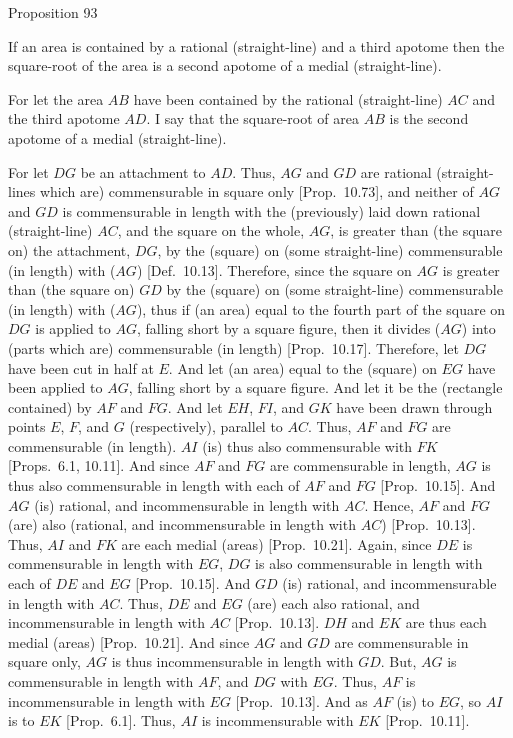 
\begin{center}
{\large Proposition 93}
\end{center}

If an area is contained by a rational (straight-line)
and a third apotome then the square-root of the area is a second apotome
of a medial (straight-line).

\epsfysize=1.3in
\centerline{}

For let the area $AB$ have been contained by the rational (straight-line)
$AC$ and the third apotome $AD$. I say that the square-root of area $AB$
is the second apotome of a medial (straight-line).

For let $DG$ be an attachment to $AD$. Thus, $AG$ and $GD$ are rational (straight-lines which are) commensurable in square only [Prop.~10.73], and neither of $AG$ and $GD$
is commensurable in length with the (previously) laid down rational (straight-line) $AC$, and the square on the whole, $AG$, is greater than
(the square on) the attachment, $DG$, by the (square) on (some straight-line)
commensurable (in length) with ($AG$) [Def.~10.13]. 
Therefore, since the square on $AG$ is greater than (the square on)
$GD$ by the (square) on (some straight-line) commensurable (in length)
with ($AG$), thus if (an area) equal to the fourth part of the square on $DG$
is applied to $AG$, falling short by a square figure, then it divides ($AG$)
into (parts which are) commensurable (in length) [Prop.~10.17]. Therefore, let $DG$ have been
cut in half at $E$. And let (an area) equal to the (square) on $EG$
have been applied to $AG$, falling short by a square figure.
And let it be the (rectangle contained) by $AF$ and $FG$. And let
$EH$, $FI$, and $GK$ have been drawn through points $E$, $F$, and $G$
(respectively), parallel to $AC$. Thus, $AF$ and $FG$ are
commensurable (in length). $AI$ (is) thus also commensurable with
$FK$ [Props.~6.1, 10.11]. 
 And since $AF$ and $FG$ are commensurable
in length, $AG$ is thus also commensurable in length with each of
$AF$ and $FG$ [Prop.~10.15]. And
$AG$ (is) rational, and incommensurable in length with $AC$. 
Hence, $AF$ and $FG$ (are) also (rational, and incommensurable in length
with $AC$) [Prop.~10.13]. 
Thus, $AI$ and $FK$ are each medial (areas) [Prop.~10.21]. Again, since $DE$ is commensurable
in length with $EG$, $DG$ is also commensurable
in length with each of $DE$ and $EG$ [Prop.~10.15]. And $GD$ (is) rational, and incommensurable in length with $AC$. Thus, $DE$ and $EG$ (are)
each also rational, and incommensurable in length with $AC$ [Prop.~10.13]. $DH$ and $EK$ are thus
each medial (areas) [Prop.~10.21]. And since 
$AG$ and $GD$ are commensurable in square only, $AG$ is thus
incommensurable in length with $GD$. But, $AG$ is commensurable in
length with $AF$, and $DG$ with $EG$. Thus, $AF$ is incommensurable
in length with $EG$ [Prop.~10.13]. 
And as $AF$ (is) to $EG$, so $AI$ is to $EK$ [Prop.~6.1]. Thus, $AI$ is incommensurable with $EK$ [Prop.~10.11].

